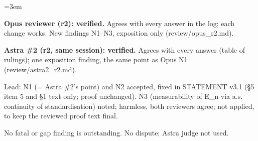 \documentclass[11pt]{report}
\newenvironment{mdblock}{\begingroup\mdfont\raggedright\setlength{\parindent}{0pt}\setlength{\parskip}{0.55em}\emergencystretch=3em}{\par\endgroup}
\begin{document}
\begin{mdblock}
\begin{mdbul}
\item \textbf{Opus reviewer (r2): verified.} Agrees with every answer in the log; each change works. New findings N1–N3, exposition only (review/opus\_r2.md).
\item \textbf{Astra \#2 (r2, same session): verified.} Agrees with every answer (table of rulings); one exposition finding, the same point as Opus N1 (review/astra2\_r2.md).
\item Lead: N1 (= Astra \#2's point) and N2 accepted, fixed in STATEMENT v3.1 (§5 item 5 and §1 text only; proof unchanged). N3 (measurability of E\_n via a.s. continuity of standardisation) noted; harmless, both reviewers agree; not applied, to keep the reviewed proof text final.
\item No fatal or gap finding is outstanding. No dispute; Astra judge not used.
\end{mdbul}
\end{mdblock}
\end{document}
